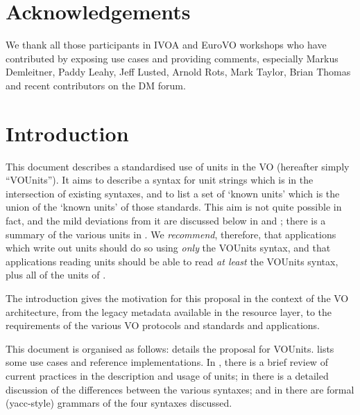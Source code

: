 \documentclass[11pt,notitlepage,onecolumn]{ivoa}
\begin{document}
\section*{Acknowledgements}

We thank all those participants in IVOA and EuroVO workshops who have
contributed by exposing use cases and providing comments, especially
Markus Demleitner,
Paddy Leahy,
Jeff Lusted,
Arnold Rots,
Mark Taylor,
Brian Thomas
and recent contributors on the DM forum.


\section{Introduction}

This document describes a standardised use of units in the VO
(hereafter simply ``VOUnits'').  It aims to describe a syntax for unit
strings which is in the intersection of existing
syntaxes, and to list a set of `known units' which is
the union of the `known units' of those standards.  This aim is not quite
possible in fact, and the mild deviations from it are discussed
below in  and ;
there is a summary of the various units in .
We \emph{recommend}, therefore, that applications which write out
units should do so using \emph{only} the VOUnits syntax, and that
applications reading units should be able to read \emph{at least} the
VOUnits syntax, plus all of the units of .

The introduction gives the motivation for
this proposal in the context of the VO architecture, from the legacy 
metadata available in the resource layer, to the requirements of the various 
VO protocols and standards and applications.

This document is organised as follows: 
details the proposal for VOUnits.  lists some
use cases and reference implementations.  In ,
there is a brief review of current practices in the description and
usage of units; in  there is a detailed
discussion of the differences between the various syntaxes; and
in  there are formal (yacc-style) grammars of
the four syntaxes discussed.
\end{document}
